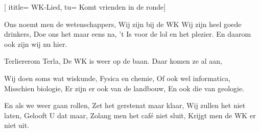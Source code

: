  [
ititle= {WK-Lied},
tu= {Komt vrienden in de ronde}]


\beginverse
Ons noemt men de wetenschappers,
Wij zijn bij de WK
Wij zijn heel goede drinkers,
Doe ons het maar eens na,
't Is voor de lol en het plezier.
En daarom ook zijn wij nu hier.
\endverse

\beginchorus
Terliererom Terla,
De WK is weer op de baan.
Daar komen ze al aan,
\endchorus

\beginverse
Wij doen soms wat wiskunde,
Fysica en chemie,
Of ook wel informatica,
Misschien biologie,
Er zijn er ook van de landbouw,
En ook die van geologie.
\endverse

\beginverse
En als we weer gaan rollen,
Zet het gerstenat maar klaar,
Wij zullen het niet laten,
Gelooft U dat maar,
Zolang men het café niet sluit,
Krijgt men de WK er niet uit.
\endverse

\endsong